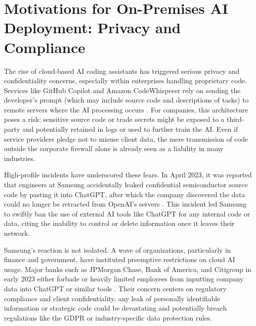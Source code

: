 \section{Motivations for On-Premises AI Deployment: Privacy and Compliance}
\label{sec:on-prem-motivations}
The rise of cloud-based \gls{AI} coding assistants has triggered serious privacy and confidentiality concerns, especially within enterprises handling proprietary code. Services like GitHub Copilot and Amazon CodeWhisperer rely on sending the developer’s prompt (which may include source code and descriptions of tasks) to remote servers where the \gls{AI} processing occurs \autocite{GithubCopilotArchitecture,AWSCodeWhispererPromptEngineering}. For companies, this architecture poses a risk: sensitive source code or trade secrets might be exposed to a third-party and potentially retained in logs or used to further train the \gls{AI}. Even if service providers pledge not to misuse client data, the mere transmission of code outside the corporate firewall alone is already seen as a liability in many industries.

High-profile incidents have underscored these fears. In April 2023, it was reported that engineers at Samsung accidentally leaked confidential semiconductor source code by pasting it into ChatGPT, after which the company discovered the data could no longer be retracted from OpenAI’s servers \autocite{Park2023Samsung}. This incident led Samsung to swiftly ban the use of external \gls{AI} tools like ChatGPT for any internal code or data, citing the inability to control or delete information once it leaves their network.

Samsung’s reaction is not isolated. A wave of organizations, particularly in finance and government, have instituted preemptive restrictions on cloud \gls{AI} usage. Major banks such as JPMorgan Chase, Bank of America, and Citigroup in early 2023 either forbade or heavily limited employees from inputting company data into ChatGPT or similar tools \autocite{Kessel2024}. Their concern centers on regulatory compliance and client confidentiality, any leak of personally identifiable information or strategic code could be devastating and potentially breach regulations like the GDPR or industry-specific data protection rules.

